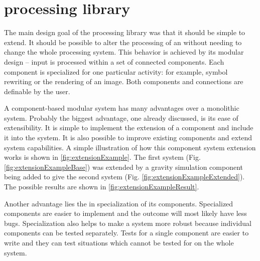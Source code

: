 
\section{\lsystem processing library}
\label{sec:design-library}

The main design goal of the \lsystem processing library was that it should be simple to extend.
It should be possible to alter the processing of an \lsystem without needing to change the whole processing system.
This behavior is achieved by its modular design -- input is processed within a set of connected components.
Each component is specialized for one particular activity: for example, symbol rewriting or the rendering of an image.
Both components and connections are definable by the user.

A component-based modular system has many advantages over a monolithic system.
Probably the biggest advantage, one already discussed, is its ease of extensibility.
It is simple to implement the extension of a component and include it into the system.
It is also possible to improve existing components and extend system capabilities.
A simple illustration of how this component system extension works is shown in \autoref{fig:extensionExample}.
The first system (Fig. \ref{fig:extensionExampleBase}) was extended by a gravity simulation component being added to give the second system (Fig. \ref{fig:extensionExampleExtended}).
The possible results are shown in \autoref{fig:extensionExampleResult}.

Another advantage lies the in specialization of its components.
Specialized components are easier to implement and the outcome will most likely have less bugs.
Specialization also helps to make a system more robust because individual components can be tested separately.
Tests for a single component are easier to write and they can test situations which cannot be tested for on the whole system.

